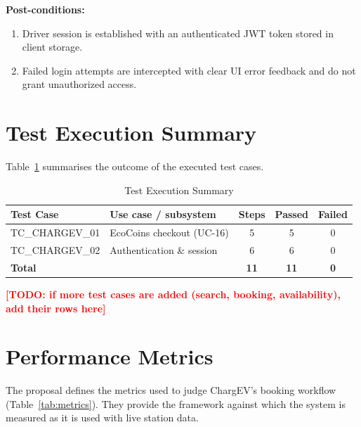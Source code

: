 \documentclass{tietreport}
\newcommand{\todo}[1]{\textcolor{red}{\textbf{[TODO: #1]}}}
\begin{document}
\vspace{-0.4em}
\noindent\textbf{Post-conditions:}
\begin{enumerate}\footnotesize
    \setlength{\itemsep}{1pt}
    \setlength{\parskip}{0pt}
    \item Driver session is established with an authenticated JWT token stored in client storage.
    \item Failed login attempts are intercepted with clear UI error feedback and do not grant unauthorized access.
\end{enumerate}

\clearpage
\section{Test Execution Summary}

Table~\ref{tab:testsummary} summarises the outcome of the
executed test cases.

\begin{table}[H]
\centering
\caption{Test Execution Summary}
\label{tab:testsummary}
\begin{tabular}{llccc}
\toprule
\textbf{Test Case} & \textbf{Use case / subsystem} & \textbf{Steps} & \textbf{Passed} & \textbf{Failed} \\
\midrule
TC\_CHARGEV\_01 & EcoCoins checkout (UC-16) & 5 & 5 & 0 \\
TC\_CHARGEV\_02 & Authentication \& session & 6 & 6 & 0 \\
\midrule
\textbf{Total} & & \textbf{11} & \textbf{11} & \textbf{0} \\
\bottomrule
\end{tabular}
\end{table}

\todo{if more test cases are added (search, booking, availability), add their rows here}

\section{Performance Metrics}

The proposal defines the metrics used to judge ChargEV's
booking workflow (Table~\ref{tab:metrics}). They provide the
framework against which the system is measured as it is
used with live station data.
\end{document}
